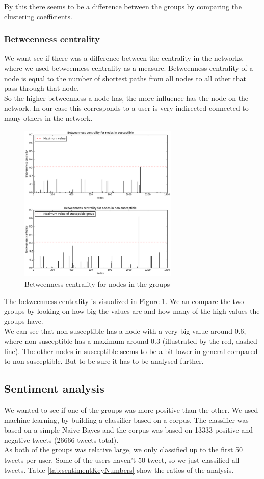 \documentclass[10pt]{IEEEtran}
\begin{document}
By this there seems to be a difference between the groups by comparing the clustering coefficients. \\

\subsubsection{Betweenness centrality}
We want see if there was a difference between the centrality in the networks, where we used betweenness centrality as a measure. Betweenness centrality of a node is equal to the number of shortest paths from all nodes to all other that pass through that node\cite{betweenness}. \\
So the higher betweenness a node has, the more influence has the node on the network. 
In our case this corresponds to a user is very indirected connected to many others in the network. 
\begin{figure}[H]
  \centering
  \includegraphics[width=3.0in]{betweenness_centrality}
  \caption{Betweenness centrality for nodes in the groups}
  \label{fig:betweenness_centrality}
\end{figure}
The betweenness centrality is visualized in Figure \ref{fig:betweenness_centrality}. We an compare the two groups by looking on how big the values are and how many of the high values the groups have. \\
We can see that non-susceptible has a node with a very big value around 0.6, where non-susceptible has a maximum around 0.3 (illustrated by the red, dashed line). 
The other nodes in susceptible seems to be a bit lower in general compared to non-susceptible. But to be sure it has to be analysed further. 


\subsection{Sentiment analysis}
We wanted to see if one of the groups was more positive than the other. We used machine learning, by building a classifier based on a corpus. The classifier was based on a simple Naive Bayes and the corpus was based on 13333 positive and negative tweets (26666 tweets total). \\
As both of the groups was relative large, we only classified up to the first 50 tweets per user. Some of the users haven't 50 tweet, so we just classified all tweets. 
Table \ref{tab:sentimentKeyNumbers} show the ratios of the analysis. 
\end{document}
